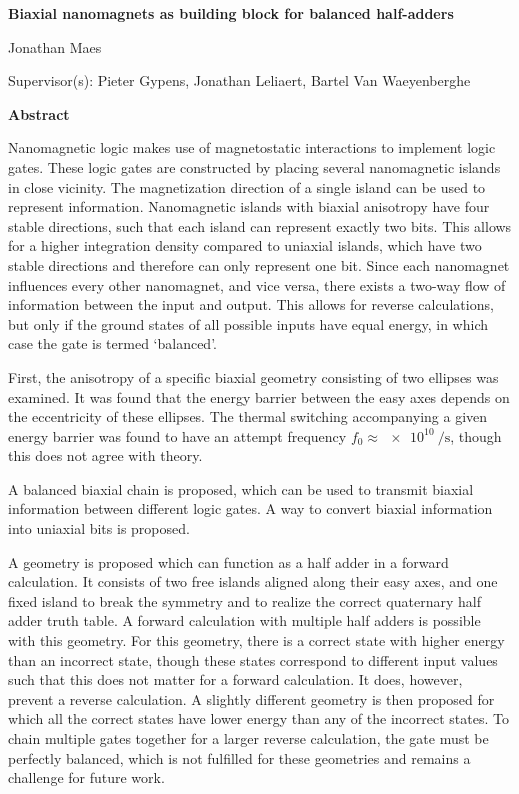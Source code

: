 \documentclass[11pt,a4paper,english,twoside]{article}
\begin{document}
\clearpage
{}
\begin{center}
    \Large
    \textbf{Biaxial nanomagnets as building block for balanced half-adders}

    \large
    \vspace{0.4cm}
    Jonathan Maes
    
    Supervisor(s): Pieter Gypens, Jonathan Leliaert, Bartel Van Waeyenberghe
       
    \vspace{0.9cm}
    \textbf{Abstract}
\end{center}
Nanomagnetic logic makes use of magnetostatic interactions to implement logic gates. These logic gates are constructed by placing several nanomagnetic islands in close vicinity. The magnetization direction of a single island can be used to represent information. Nanomagnetic islands with biaxial anisotropy have four stable directions, such that each island can represent exactly two bits. This allows for a higher integration density compared to uniaxial islands, which have two stable directions and therefore can only represent one bit. Since each nanomagnet influences every other nanomagnet, and vice versa, there exists a two-way flow of information between the input and output. This allows for reverse calculations, but only if the ground states of all possible inputs have equal energy, in which case the gate is termed `balanced'. \par
First, the anisotropy of a specific biaxial geometry consisting of two ellipses was examined. It was found that the energy barrier between the easy axes depends on the eccentricity of these ellipses. The thermal switching accompanying a given energy barrier was found to have an attempt frequency $f_0 \approx \SI{e10}{\per\second}$, though this does not agree with theory. \par
A balanced biaxial chain is proposed, which can be used to transmit biaxial information between different logic gates. A way to convert biaxial information into uniaxial bits is proposed. \par
A geometry is proposed which can function as a half adder in a forward calculation. It consists of two free islands aligned along their easy axes, and one fixed island to break the symmetry and to realize the correct quaternary half adder truth table. A forward calculation with multiple half adders is possible with this geometry. For this geometry, there is a correct state with higher energy than an incorrect state, though these states correspond to different input values such that this does not matter for a forward calculation. It does, however, prevent a reverse calculation. A slightly different geometry is then proposed for which all the correct states have lower energy than any of the incorrect states. To chain multiple gates together for a larger reverse calculation, the gate must be perfectly balanced, which is not fulfilled for these geometries and remains a challenge for future work.
\end{document}

